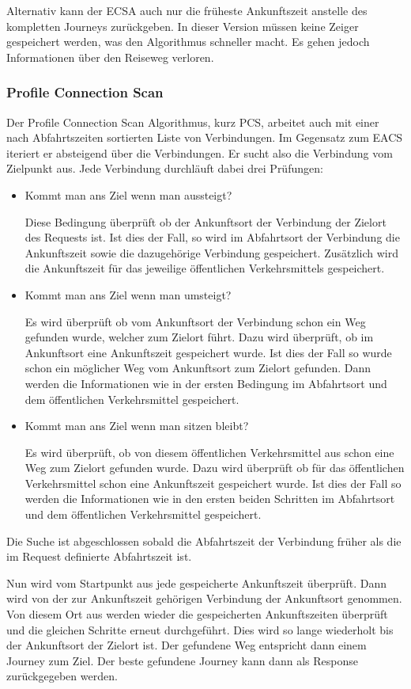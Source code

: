 Alternativ kann der ECSA auch nur die früheste Ankunftszeit anstelle des kompletten Journeys zurückgeben. In dieser Version müssen keine Zeiger gespeichert werden, was den Algorithmus schneller macht. Es gehen jedoch Informationen über den Reiseweg verloren.

\subsubsection{Profile Connection Scan}
Der Profile Connection Scan Algorithmus\cite{csa}, kurz PCS, arbeitet auch mit einer nach Abfahrtszeiten sortierten Liste von Verbindungen. Im Gegensatz zum EACS iteriert er absteigend über die Verbindungen. Er sucht also die Verbindung vom Zielpunkt aus. Jede Verbindung durchläuft dabei drei Prüfungen:

\begin{itemize}
	\item Kommt man ans Ziel wenn man aussteigt?
	
	Diese Bedingung überprüft ob der Ankunftsort der Verbindung der Zielort des Requests ist. Ist dies der Fall, so wird im Abfahrtsort der Verbindung die Ankunftszeit sowie die dazugehörige Verbindung gespeichert. Zusätzlich wird die Ankunftszeit für das jeweilige öffentlichen Verkehrsmittels gespeichert.
	\item Kommt man ans Ziel wenn man umsteigt?
	
	Es wird überprüft ob vom Ankunftsort der Verbindung schon ein Weg gefunden wurde, welcher zum Zielort führt. Dazu wird überprüft, ob im Ankunftsort eine Ankunftszeit gespeichert wurde. Ist dies der Fall so wurde schon ein möglicher Weg vom Ankunftsort zum Zielort gefunden. Dann werden die Informationen wie in der ersten Bedingung im Abfahrtsort und dem öffentlichen Verkehrsmittel gespeichert.
	\item Kommt man ans Ziel wenn man sitzen bleibt?
	
	Es wird überprüft, ob von diesem öffentlichen Verkehrsmittel aus schon eine Weg zum Zielort gefunden wurde. Dazu wird überprüft ob für das öffentlichen Verkehrsmittel schon eine Ankunftszeit gespeichert wurde. Ist dies der Fall so werden die Informationen wie in den ersten beiden Schritten im Abfahrtsort und dem öffentlichen Verkehrsmittel gespeichert.
\end{itemize}
Die Suche ist abgeschlossen sobald die Abfahrtszeit der Verbindung früher als die im Request definierte Abfahrtszeit ist. 

Nun wird vom Startpunkt aus jede gespeicherte Ankunftszeit überprüft. Dann wird von der zur Ankunftszeit gehörigen Verbindung der Ankunftsort genommen. Von diesem Ort aus werden wieder die gespeicherten Ankunftszeiten überprüft und die gleichen Schritte erneut durchgeführt. Dies wird so lange wiederholt bis der Ankunftsort der Zielort ist. Der gefundene Weg entspricht dann einem Journey zum Ziel. Der beste gefundene Journey kann dann als Response zurückgegeben werden. 
